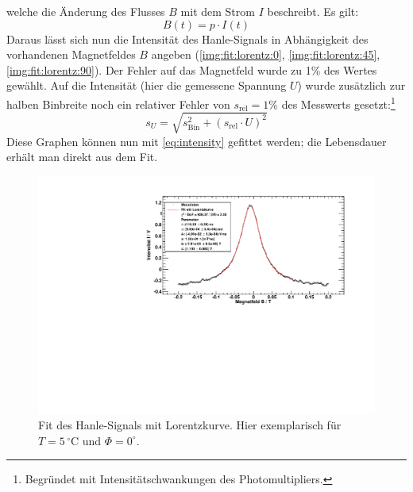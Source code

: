 welche die Änderung des Flusses $B$ mit dem Strom $I$ beschreibt. 
Es gilt:
\begin{equation}
  B(t) = p \cdot I(t)
\end{equation}
Daraus lässt sich nun die Intensität des Hanle-Signals in Abhängigkeit des vorhandenen Magnetfeldes $B$ angeben (\autoref{img:fit:lorentz:0}, 
\autoref{img:fit:lorentz:45}, \autoref{img:fit:lorentz:90}).
Der Fehler auf das Magnetfeld wurde zu 1\% des Wertes gewählt. Auf die Intensität (hier die gemessene Spannung $U$) wurde zusätzlich zur halben Binbreite 
noch ein relativer Fehler von \mbox{$ s_\text{rel} = 1\% $} des Messwerts gesetzt:\footnote{Begründet mit Intensitätschwankungen des Photomultipliers.}
\begin{equation}
  s_U = \sqrt{s_{\text{Bin}}^2 + (s_\text{rel} \cdot U)^2}
\end{equation}
Diese Graphen können nun mit \autoref{eq:intensity} gefittet werden;
die Lebensdauer erhält man direkt aus dem Fit.
\begin{figure}[H]
\begin{center}
  \includegraphics[width=\textwidth]{../img/fit_00_p05_1.pdf}
  \caption{Fit des Hanle-Signals mit Lorentzkurve. Hier exemplarisch für $T=5\,{}^\circ$C und $\Phi=0^\circ$.}
  \label{img:fit:lorentz:0}
\end{center}
\end{figure}
